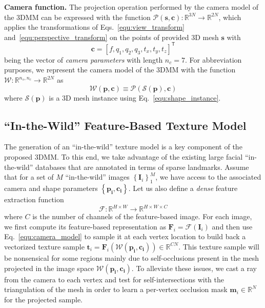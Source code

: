 %
\textbf{Camera function.}
The projection operation performed by the camera model of the 3DMM can be
expressed with the function
$\mathcal{P}(\mathbf{s},\mathbf{c}): \mathbb{R}^{3N} \rightarrow \mathbb{R}^{2N}$,
which applies the transformations of Eqs.~\ref{equ:view_transform} and~\ref{equ:perspective_transform}
on the points of provided 3D mesh $\mathbf{s}$ with
%
\begin{equation}
\mathbf{c} = {\left[f, q_1, q_2, q_3, t_x, t_y, t_z\right]}^\mathsf{T}
\end{equation}
%
being the vector of \emph{camera parameters} with length $n_c=7$.
For abbreviation purposes, we represent the camera model of the 3DMM with the
function $\mathcal{W}: \mathbb{R}^{n_s,n_c} \rightarrow \mathbb{R}^{2N}$ as
%
\begin{equation}
\mathcal{W}(\mathbf{p},\mathbf{c})\equiv\mathcal{P}\left(\mathcal{S}(\mathbf{p}),\mathbf{c}\right)
\label{equ:camera_model}
\end{equation}
%
where $\mathcal{S}(\mathbf{p})$ is a 3D mesh instance using Eq.~\ref{equ:shape_instance}.

%
%
%
\subsection{``In-the-Wild'' Feature-Based Texture Model}
\label{sec:texture-model}
The generation of an ``in-the-wild'' texture model is a key component of the
proposed 3DMM. To this end, we take advantage of the existing large facial ``in-the-wild''
databases that are annotated in terms of sparse landmarks.
Assume that for a set of $M$ ``in-the-wild'' images
$\left\lbrace\mathbf{I}_i\right\rbrace_1^M$, we have access to the associated
camera and shape parameters $\left\lbrace\mathbf{p_i}, \mathbf{c_i}\right\rbrace$.
Let us also define a \emph{dense} feature extraction function
%
\begin{equation}
\mathcal{F}: \mathbb{R}^{H\times W}\rightarrow\mathbb{R}^{H\times W \times C}
\label{equ:features}
\end{equation}
%
where $C$ is the number of channels of the feature-based image. For each image,
we first compute its feature-based representation as
$\mathbf{F}_i = \mathcal{F}(\mathbf{I}_i)$ and then use Eq.~\ref{equ:camera_model}
to sample it at each vertex location to build back a vectorized texture sample
$\mathbf{t}_i = \mathbf{F}_i\left(\mathcal{W}(\mathbf{p_i},\mathbf{c_i})\right) \in \mathbb{R}^{CN}$.
This texture sample will be nonsensical for some regions mainly due to self-occlusions
present in the mesh projected in the image space
$\mathcal{W}(\mathbf{p_i},\mathbf{c_i})$.
%
To alleviate these issues, we cast a ray from the camera to each vertex and test
for self-intersections with the triangulation of the mesh in order to learn a
per-vertex occlusion mask $\mathbf{m}_i\in\mathbb{R}^{N}$ for the projected sample.


